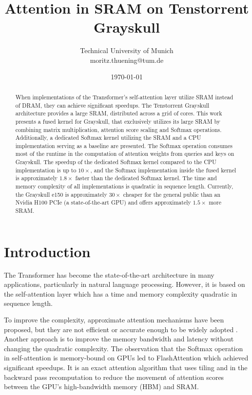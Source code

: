 \documentclass[conference]{IEEEtran}
\begin{document}
\title{Attention in SRAM on Tenstorrent Grayskull}

\author{
Technical University of Munich \\
moritz.thuening@tum.de}

\date{\today}

\maketitle

\begin{abstract}
\boldmath
When implementations of the Transformer's self-attention layer utilize SRAM instead of DRAM, they can achieve significant speedups. The Tenstorrent Grayskull architecture provides a large SRAM, distributed across a grid of cores. This work presents a fused kernel for Grayskull, that exclusively utilizes its large SRAM by combining matrix multiplication, attention score scaling and Softmax operations. Additionally, a dedicated Softmax kernel utilizing the SRAM and a CPU implementation serving as a baseline are presented. The Softmax operation consumes most of the runtime in the computation of attention weights from queries and keys on Grayskull. The speedup of the dedicated Softmax kernel compared to the CPU implementation is up to \(10 \times\), and the Softmax implementation inside the fused kernel is approximately \(1.8 \times\) faster than the dedicated Softmax kernel. The time and memory complexity of all implementations is quadratic in sequence length. Currently, the Grayskull e150 is approximately \(30 \times\) cheaper for the general public than an Nvidia H100 PCIe (a state-of-the-art GPU) and offers approximately \(1.5 \times\) more SRAM.
\end{abstract}

\section{Introduction}
The Transformer \cite{vaswani2017} has become the state-of-the-art architecture in many applications, particularly in natural language processing. However, it is based on the self-attention layer which has a time and memory complexity quadratic in sequence length.

To improve the complexity, approximate attention mechanisms have been proposed, but they are not efficient or accurate enough to be widely adopted \cite{kitaev2020, roy2021, choromanski2021, katharopoulos2020, wang2020, beltagy2020, chen2021, zaheer2020}. Another approach is to improve the memory bandwidth and latency without changing the quadratic complexity. The observation that the Softmax operation in self-attention is memory-bound on GPUs led to FlashAttention \cite{dao2022} which achieved significant speedups. It is an exact attention algorithm that uses tiling and in the backward pass recomputation to reduce the movement of attention scores between the GPU's high-bandwidth memory (HBM) and SRAM.
\end{document}
